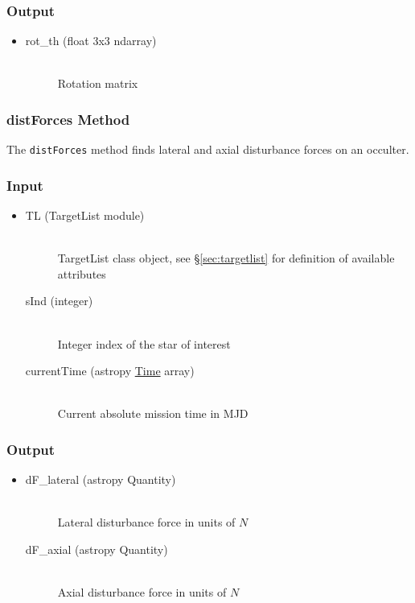 \documentclass[cleanfoot]{asme2ej}
\begin{document}
\subsubsection*{Output}
\begin{itemize}
\item
\begin{description}
    \item[rot\_th (float 3x3 ndarray)] \hfill \\ Rotation matrix
\end{description}
\end{itemize}

\subsubsection{distForces Method} \label{sec:distforcestask} 
The \verb+distForces+ method finds lateral and axial disturbance forces on an occulter.
\subsubsection*{Input}
\begin{itemize}
\item
\begin{description}
    \item[TL (TargetList module)] \hfill \\ TargetList class object, see \S\ref{sec:targetlist} for definition of available attributes
    \item[sInd (integer)] \hfill \\ Integer index of the star of interest
    \item[currentTime (astropy \href{http://astropy.readthedocs.org/en/latest/time/index.html}{Time} array)] \hfill \\ Current absolute mission time in MJD
\end{description}
\end{itemize}
\subsubsection*{Output}
\begin{itemize}
\item 
\begin{description}
    \item[dF\_lateral (astropy Quantity)] \hfill \\ Lateral disturbance force in units of $N$
    \item[dF\_axial (astropy Quantity)] \hfill \\ Axial disturbance force in units of $N$
\end{description}
\end{itemize}
\end{document}
